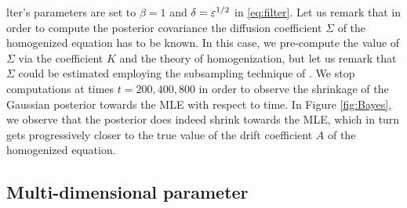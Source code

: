 \documentclass[10pt]{article}
\begin{document}
lter's parameters are set to $\beta = 1$ and $\delta = \varepsilon^{1/2}$ in \eqref{eq:filter}. Let us remark that in order to compute the posterior covariance the diffusion coefficient $\Sigma$ of the homogenized equation has to be known. In this case, we pre-compute the value of $\Sigma$ via the coefficient $K$ and the theory of homogenization, but let us remark that $\Sigma$ could be estimated employing the subsampling technique of \cite{PaS07}. We stop computations at times $t = 200, 400, 800$ in order to observe the shrinkage of the Gaussian posterior towards the MLE with respect to time. In Figure \ref{fig:Bayes}, we observe that the posterior does indeed shrink towards the MLE, which in turn gets progressively closer to the true value of the drift coefficient $A$ of the homogenized equation.


\subsection{Multi-dimensional parameter}
\end{document}
